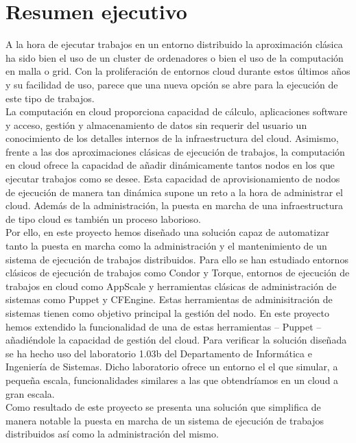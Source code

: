 \chapter{Resumen ejecutivo}
\label{cap:resumen}

{\sf

A la hora de ejecutar trabajos en un entorno distribuido la aproximación clásica ha sido bien el uso de un cluster de ordenadores o bien el uso de la computación en malla o grid. Con la proliferación de entornos cloud durante estos últimos años y su facilidad de uso, parece que una nueva opción se abre para la ejecución de este tipo de trabajos.\\

La computación en cloud proporciona capacidad de cálculo, aplicaciones software y acceso, gestión y almacenamiento de datos sin requerir del usuario un conocimiento de los detalles internos de la infraestructura del cloud. Asimismo, frente a las dos aproximaciones clásicas de ejecución de trabajos, la computación en cloud ofrece la capacidad de añadir dinámicamente tantos nodos en los que ejecutar trabajos como se desee. Esta capacidad de aprovisionamiento de nodos de ejecución de manera tan dinámica supone un reto a la hora de administrar el cloud. Además de la administración, la puesta en marcha de una infraestructura de tipo cloud es también un proceso laborioso.\\

Por ello, en este proyecto hemos diseñado una solución capaz de automatizar tanto la puesta en marcha como la administración y el mantenimiento de un sistema de ejecución de trabajos distribuidos. Para ello se han estudiado entornos clásicos de ejecución de trabajos como Condor y Torque, entornos de ejecución de trabajos en cloud como AppScale y herramientas clásicas de administración de sistemas como Puppet y CFEngine. Estas herramientas de adminisitración de sistemas tienen como objetivo principal la gestión del nodo. En este proyecto hemos extendido la funcionalidad de una de estas herramientas -- Puppet -- añadiéndole la capacidad de gestión del cloud. Para verificar la solución diseñada se ha hecho uso del laboratorio 1.03b del Departamento de Informática e Ingeniería de Sistemas. Dicho laboratorio ofrece un entorno el el que simular, a pequeña escala, funcionalidades similares a las que obtendríamos en un cloud a gran escala.\\

Como resultado de este proyecto se presenta una solución que simplifica de manera notable la puesta en marcha de un sistema de ejecución de trabajos distribuidos así como la administración del mismo.
}
